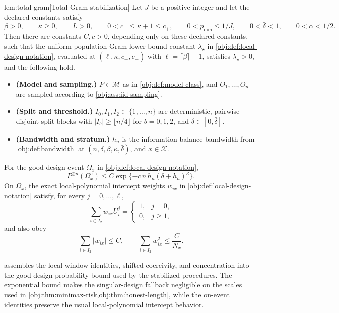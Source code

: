 \begin{lemmav}{lem:total-gram}[Total Gram stabilization]
Let \(J\) be a positive integer and let the declared constants satisfy
\[
\beta>0,\qquad \kappa\ge 0,\qquad L>0,\qquad
0<c_-\le \kappa+1\le c_+,\qquad
0<p_{\min}\le 1/J,\qquad
0<\bar\delta<1,\qquad 0<\alpha<1/2 .
\]
Then there are constants \(C,c>0\), depending only on these declared constants, such that the uniform population Gram lower-bound constant \(\lambda_\star\) in \cref{obj:def:local-design-notation}, evaluated at \((\ell,\kappa,c_-,c_+)\) with \(\ell=\lceil\beta\rceil-1\), satisfies \(\lambda_\star>0\), and the following hold.

\begin{itemize}
\item \textbf{(Model and sampling.)} \(P\in\mathcal M\) as in \cref{obj:def:model-class}, and \(O_1,\ldots,O_n\) are sampled according to \cref{obj:ass:iid-sampling}.
\item \textbf{(Split and threshold.)} \(I_0,I_1,I_2\subset\{1,\ldots,n\}\) are deterministic, pairwise-disjoint split blocks with \(|I_b|\ge \lfloor n/4\rfloor\) for \(b=0,1,2\), and \(\delta\in[0,\bar\delta]\).
\item \textbf{(Bandwidth and stratum.)} \(h_n\) is the information-balance bandwidth from \cref{obj:def:bandwidth} at \((n,\delta,\beta,\kappa,\bar\delta)\), and \(x\in\mathcal X\).
\end{itemize}

For the good-design event \(\Omega_x\) in \cref{obj:def:local-design-notation},
\[
P^{\otimes n}(\Omega_x^c)
\le
C\exp\{-c\,n\,h_n(\delta+h_n)^\kappa\}.
\]
On \(\Omega_x\), the exact local-polynomial intercept weights \(w_{ix}\) in \cref{obj:def:local-design-notation} satisfy, for every \(j=0,\ldots,\ell\),
\[
\sum_{i\in I_2} w_{ix} U_i^j
=
\begin{cases}
1, & j=0,\\
0, & j\ge 1,
\end{cases}
\]
and also obey
\[
\sum_{i\in I_2}|w_{ix}|\le C,
\qquad
\sum_{i\in I_2}w_{ix}^2\le \frac{C}{N_x}.
\]
\end{lemmav}

 assembles the local-window identities, shifted coercivity, and concentration into the good-design probability bound used by the stabilized procedures. The exponential bound makes the singular-design fallback negligible on the scales used in \cref{obj:thm:minimax-risk,obj:thm:honest-length}, while the on-event identities preserve the usual local-polynomial intercept behavior.

